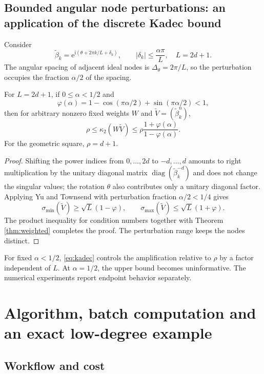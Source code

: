 \documentclass[10pt,twoside,final]{siamart1116}
\numberwithin{equation}{section}
\numberwithin{theorem}{section}
\newcommand{\diag}{\operatorname{diag}}
\newcommand{\cond}{\kappa_2}
\newcommand{\e}{\mathrm e}
\newcommand{\ii}{\mathrm i}
\begin{document}
\subsection{Bounded angular node perturbations: an application of the discrete Kadec bound}

Consider
\[
\widetilde\beta_k=\e^{\ii(\theta+2\pi k/L+\delta_k)},\qquad
|\delta_k|\le\frac{\alpha\pi}{L},\quad L=2d+1.
\]
The angular spacing of adjacent ideal nodes is $\Delta_\theta=2\pi/L$, so the perturbation occupies
the fraction $\alpha/2$ of the spacing.

\begin{corollary}\label{cor:kadec}
For $L=2d+1$, if $0\le\alpha<1/2$ and
\[
\varphi(\alpha)=1-\cos(\pi\alpha/2)+\sin(\pi\alpha/2)<1,
\]
then for arbitrary nonzero fixed weights $W$ and $\widetilde V=(\widetilde\beta_k^n)$,
\begin{equation}\label{eq:kadec}
\rho\le\cond(W\widetilde V)
\le\rho\frac{1+\varphi(\alpha)}{1-\varphi(\alpha)}.
\end{equation}
For the geometric square, $\rho=d+1$.
\end{corollary}
\begin{proof}
Shifting the power indices from $0,\ldots,2d$ to $-d,\ldots,d$ amounts to right
multiplication by the unitary diagonal matrix $\diag(\widetilde\beta_k^{-d})$ and does
not change the singular values; the rotation $\theta$ also contributes only a unitary
diagonal factor. Applying Yu and Townsend \cite[Theorem 2.1, Corollary 2.3]{yu} with
perturbation fraction $\alpha/2<1/4$ gives
\[
\sigma_{\min}(\widetilde V)\ge\sqrt L(1-\varphi),\qquad
\sigma_{\max}(\widetilde V)\le\sqrt L(1+\varphi).
\]
The product inequality for condition numbers together with Theorem \ref{thm:weighted}
completes the proof. The perturbation range keeps the nodes distinct.
\end{proof}

For fixed $\alpha<1/2$, \eqref{eq:kadec} controls the amplification relative to $\rho$
by a factor independent of $L$. At $\alpha=1/2$, the upper bound becomes
uninformative. The numerical experiments report endpoint behavior separately.

\section{Algorithm, batch computation and an exact low-degree example}
\label{sec:algorithm}

\subsection{Workflow and cost}
\end{document}
